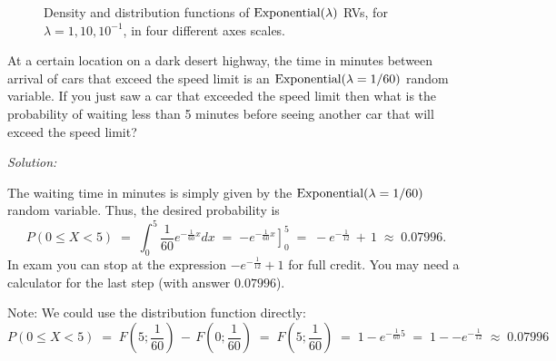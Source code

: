 
\begin{figure}[htpb]
\caption{Density and distribution functions of $\mbox{{\rm Exponential}}(\lambda)$ RVs, for $\lambda=1, 10, 10^{-1}$, in four different axes scales.\label{F:plotPdfCdfExponentials}}
\centering   {}
\end{figure}

\begin{example}\label{darkDesHWWaitingTime}
{At a certain location on a dark desert highway, the time in minutes between arrival of cars that exceed the speed limit is an $\mbox{{\rm Exponential}}(\lambda=1/60)$ random variable. 
If you just saw a car that exceeded the speed limit then what is the probability of waiting less than 5 minutes before seeing another car that will exceed the speed limit?}

{\em Solution:}\\[4pt]
{
The waiting time in minutes is simply given by the $\mbox{{\rm Exponential}}(\lambda=1/60)$ random variable.  
Thus, the desired probability is 
\[
P(0 \leq X < 5)
\;=\;\int_0^5\frac{1}{60}e^{-\frac{1}{60}x}dx
\;=\;\left.-e^{-\frac{1}{60}x}\right]_0^5
\;=\;-e^{-\frac{1}{12}}\,+\,1\;\approx\; 0.07996.
\]
In exam you can stop at the expression $-e^{-\frac{1}{12}}+1$ for full credit.  
You may need a calculator for the last step (with answer $0.07996$).

Note: We could use the distribution function directly:
\[P(0 \leq X < 5)\;=\;  F\left(5; \frac{1}{60}\right) \,-\, F\left(0;\frac{1}{60}\right) \;=\;
F\left(5;\frac{1}{60}\right) \;=\; 1-e^{-\frac{1}{60}5} \;=\; 1--e^{-\frac{1}{12}} \;\approx\; 0.07996\]
}
\end{example}

